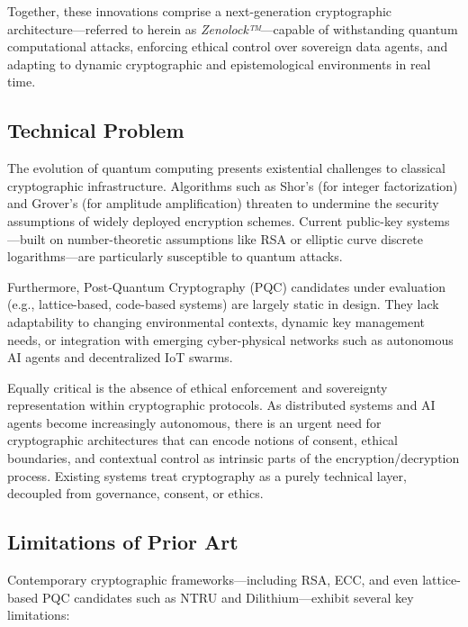 \documentclass{article}
\theoremstyle{plain}
\begin{document}
Together, these innovations comprise a next-generation cryptographic architecture—referred to herein as \textit{Zenolock™}—capable of withstanding quantum computational attacks, enforcing ethical control over sovereign data agents, and adapting to dynamic cryptographic and epistemological environments in real time.

\subsection{Technical Problem}

The evolution of quantum computing presents existential challenges to classical cryptographic infrastructure. Algorithms such as Shor’s (for integer factorization) and Grover’s (for amplitude amplification) threaten to undermine the security assumptions of widely deployed encryption schemes. Current public-key systems—built on number-theoretic assumptions like RSA or elliptic curve discrete logarithms—are particularly susceptible to quantum attacks.

Furthermore, Post-Quantum Cryptography (PQC) candidates under evaluation (e.g., lattice-based, code-based systems) are largely static in design. They lack adaptability to changing environmental contexts, dynamic key management needs, or integration with emerging cyber-physical networks such as autonomous AI agents and decentralized IoT swarms.

Equally critical is the absence of ethical enforcement and sovereignty representation within cryptographic protocols. As distributed systems and AI agents become increasingly autonomous, there is an urgent need for cryptographic architectures that can encode notions of consent, ethical boundaries, and contextual control as intrinsic parts of the encryption/decryption process. Existing systems treat cryptography as a purely technical layer, decoupled from governance, consent, or ethics.

\subsection{Limitations of Prior Art}

Contemporary cryptographic frameworks—including RSA, ECC, and even lattice-based PQC candidates such as NTRU and Dilithium—exhibit several key limitations:
\end{document}
